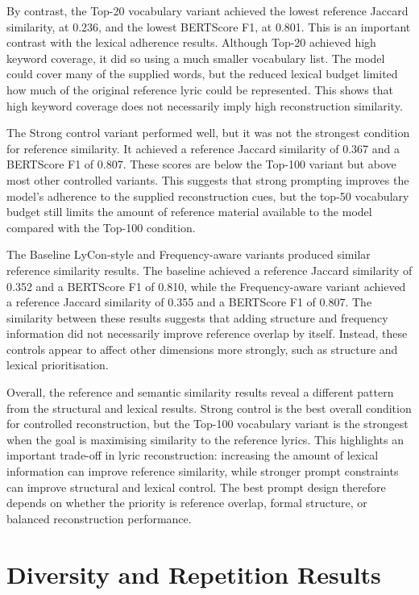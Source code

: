 By contrast, the Top-20 vocabulary variant achieved the lowest reference Jaccard similarity, at 0.236, and the lowest BERTScore F1, at 0.801. This is an important contrast with the lexical adherence results. Although Top-20 achieved high keyword coverage, it did so using a much smaller vocabulary list. The model could cover many of the supplied words, but the reduced lexical budget limited how much of the original reference lyric could be represented. This shows that high keyword coverage does not necessarily imply high reconstruction similarity.

The Strong control variant performed well, but it was not the strongest condition for reference similarity. It achieved a reference Jaccard similarity of 0.367 and a BERTScore F1 of 0.807. These scores are below the Top-100 variant but above most other controlled variants. This suggests that strong prompting improves the model's adherence to the supplied reconstruction cues, but the top-50 vocabulary budget still limits the amount of reference material available to the model compared with the Top-100 condition.

The Baseline LyCon-style and Frequency-aware variants produced similar reference similarity results. The baseline achieved a reference Jaccard similarity of 0.352 and a BERTScore F1 of 0.810, while the Frequency-aware variant achieved a reference Jaccard similarity of 0.355 and a BERTScore F1 of 0.807. The similarity between these results suggests that adding structure and frequency information did not necessarily improve reference overlap by itself. Instead, these controls appear to affect other dimensions more strongly, such as structure and lexical prioritisation.

Overall, the reference and semantic similarity results reveal a different pattern from the structural and lexical results. Strong control is the best overall condition for controlled reconstruction, but the Top-100 vocabulary variant is the strongest when the goal is maximising similarity to the reference lyrics. This highlights an important trade-off in lyric reconstruction: increasing the amount of lexical information can improve reference similarity, while stronger prompt constraints can improve structural and lexical control. The best prompt design therefore depends on whether the priority is reference overlap, formal structure, or balanced reconstruction performance.

\section{Diversity and Repetition Results}

